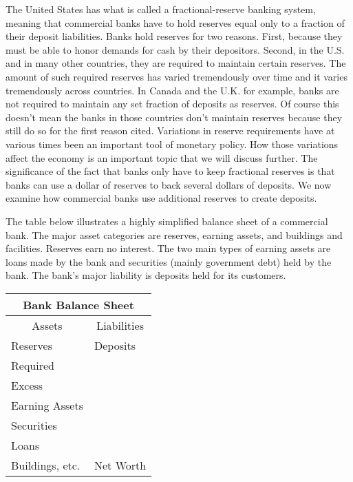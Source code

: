 \documentclass[letterpaper,12pt]{article}
\begin{document}
The United States has what is called a fractional-reserve banking
system, meaning that commercial banks have to hold reserves equal
only to a fraction of their deposit liabilities. Banks hold reserves
for two reasons. First, because they must be able to honor demands
for cash by their depositors. Second, in the U.S. and in many other
countries, they are required to maintain certain reserves. The
amount of such required reserves has varied tremendously over time
and it varies tremendously across countries. In Canada and the U.K.
for example, banks are not required to maintain any set fraction of
deposits as reserves. Of course this doesn't mean the banks in those
countries don't maintain reserves because they still do so for the
first reason cited. Variations in reserve requirements have at
various times been an important tool of monetary policy. How those
variations affect the economy is an important topic that we will
discuss further. The significance of the fact that banks only have
to keep fractional reserves is that banks can use a dollar of
reserves to back several dollars of deposits. We now examine how
commercial banks use additional reserves to create deposits.

The table below illustrates a highly simplified balance sheet of a
commercial bank. The major asset categories are reserves, earning
assets, and buildings and facilities. Reserves earn no interest. The
two main types of earning assets are loans made by the bank and
securities (mainly government debt) held by the bank. The bank's
major liability is deposits held for its customers.

\begin{center}
\begin{tabular}{|c|c|}
\hline \multicolumn{2}{|c|}{Bank Balance Sheet} \\
\hline\hline Assets & Liabilities \\ \hline\hline
\multicolumn{1}{|l}{Reserves} & \multicolumn{1}{|l|}{Deposits} \\
\multicolumn{1}{|l}{\thinspace\thinspace\thinspace\thinspace\thinspace
\thinspace\thinspace\thinspace\thinspace\thinspace\thinspace\thinspace
\thinspace Required} & \multicolumn{1}{|l|}{} \\
\multicolumn{1}{|l}{\thinspace\thinspace\thinspace\thinspace\thinspace
\thinspace\thinspace\thinspace\thinspace\thinspace\thinspace\thinspace
\thinspace\thinspace\thinspace Excess} & \multicolumn{1}{|l|}{} \\
\multicolumn{1}{|l}{Earning Assets} & \multicolumn{1}{|l|}{} \\
\multicolumn{1}{|l}{\thinspace\thinspace\thinspace\thinspace\thinspace
\thinspace\thinspace\thinspace\thinspace\thinspace\thinspace\thinspace
\thinspace\thinspace Securities} & \multicolumn{1}{|l|}{} \\
\multicolumn{1}{|l}{\thinspace\thinspace\thinspace\thinspace\thinspace
\thinspace\thinspace\thinspace\thinspace\thinspace\thinspace\thinspace
\thinspace\thinspace Loans} & \multicolumn{1}{|l|}{} \\
\multicolumn{1}{|l}{Buildings, etc.} & \multicolumn{1}{|l|}{Net Worth} \\
\hline
\end{tabular}
\end{center}
\end{document}
